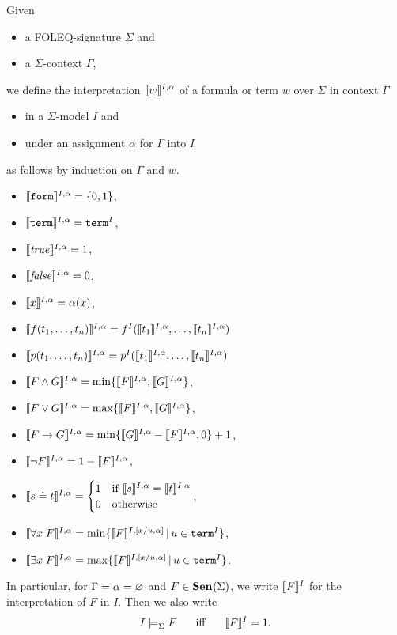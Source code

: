 \begin{definition}\label{def:fol:interpretation}
Given 
\begin{itemize}
\item a FOLEQ-signature $\Sigma$ and
\item a $\Sigma$-context $\Gamma$,
\end{itemize}
we define the interpretation $\llbracket w\rrbracket^{I,\alpha}$ of a formula or term $w$ over $\Sigma$ in context $\Gamma$
\begin{itemize}
\item in a $\Sigma$-model $I$ and
\item under an assignment $\alpha$ for $\Gamma$ into $I$
\end{itemize}
as follows by induction on $\Gamma$ and $w$.
\begin{itemize}
\item $\llbracket \mathtt{form}\rrbracket^{I,\alpha}=\{0,1\}$,
\item $\llbracket \mathtt{term}\rrbracket^{I,\alpha}=\mathtt{term}^I$,
\item $\llbracket \mathit{true}\rrbracket^{I,\alpha} = 1$,
\item $\llbracket \mathit{false}\rrbracket^{I,\alpha} = 0$,
\item $\llbracket x\rrbracket^{I,\alpha}=\alpha(x)$,
\item $\llbracket f(t_1,\ldots,t_n)\rrbracket^{I,\alpha} = f^I(\llbracket t_1\rrbracket^{I,\alpha},\ldots,\llbracket t_n\rrbracket^{I,\alpha})$
\item $\llbracket p(t_1,\ldots,t_n)\rrbracket^{I,\alpha} = p^I(\llbracket t_1\rrbracket^{I,\alpha},\ldots,\llbracket t_n\rrbracket^{I,\alpha})$
\item $\llbracket F\wedge G\rrbracket^{I,\alpha} = \min\{\llbracket F\rrbracket^{I,\alpha},\llbracket G\rrbracket^{I,\alpha}\}$,
\item $\llbracket F\vee G\rrbracket^{I,\alpha} = \max\{\llbracket F\rrbracket^{I,\alpha},\llbracket G\rrbracket^{I,\alpha}\}$,
\item $\llbracket F\rightarrow G\rrbracket^{I,\alpha} = \min\{\llbracket G\rrbracket^{I,\alpha}-\llbracket F\rrbracket^{I,\alpha},0\}+1$,
\item $\llbracket \neg F\rrbracket^{I,\alpha} = 1-\llbracket F\rrbracket^{I,\alpha}$,
\item $\llbracket s\doteq t\rrbracket^{I,\alpha} = \begin{cases}1&\mathrm{if}\; \llbracket s\rrbracket^{I,\alpha}=\llbracket t\rrbracket^{I,\alpha} \\ 0&\mathrm{otherwise}\end{cases}$,
\item $\llbracket \forall x\;F\rrbracket^{I,\alpha} = \min\{\llbracket F\rrbracket^{I,[x/u,\alpha]} \,|\, u\in \mathtt{term}^I\}$,
\item $\llbracket \exists x\;F\rrbracket^{I,\alpha} = \max\{\llbracket F\rrbracket^{I,[x/u,\alpha]} \,|\, u\in \mathtt{term}^I\}$.
\end{itemize}
In particular, for $\Gamma=\alpha=\varnothing$ and $F\in{\mathbf{Sen}^{}}(\Sigma)$, we write $\llbracket F\rrbracket^{I}$ for the interpretation of $F$ in $I$.
Then we also write \[I\models^{}_{\Sigma}F \hspace*{.5cm}\;\mathrm{iff}\;\hspace*{.5cm} \llbracket F\rrbracket^{I}=1.\]
\end{definition}

